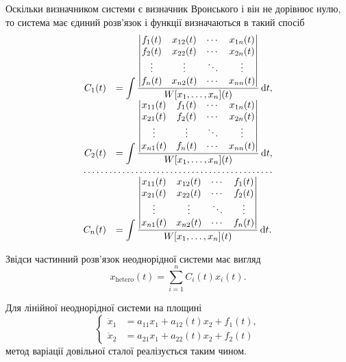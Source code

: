 Оскільки визначником системи є визначник Вронського і він не дорівнює нулю, то система має єдиний розв'язок і функції  визначаються в такий спосіб
\begin{equation*}
	\begin{array}{rl}
		C_1(t) &= \displaystyle \int \frac{\begin{vmatrix} f_1(t) & x_{12}(t) & \cdots & x_{1n}(t) \\ f_2(t) & x_{22}(t) & \cdots & x_{2n}(t) \\ \vdots & \vdots & \ddots & \vdots \\ f_n(t) & x_{n2}(t) & \cdots & x_{nn}(t) \end{vmatrix}}{W[x_1, \ldots, x_n](t)} \diff t, \\
		C_2(t) &= \displaystyle \int \frac{\begin{vmatrix} x_{11}(t) & f_1(t) & \cdots & x_{1n}(t) \\ x_{21}(t) & f_2(t) & \cdots & x_{2n}(t) \\ \vdots & \vdots & \ddots & \vdots \\ x_{n1}(t) & f_n(t) & \cdots & x_{nn}(t) \end{vmatrix}}{W[x_1, \ldots, x_n](t)} \diff t, \\
		\hdotsfor{2} \\
		C_n(t) &= \displaystyle \int \frac{\begin{vmatrix} x_{11}(t) & x_{12}(t) & \cdots & f_1(t) \\ x_{21}(t) & x_{22}(t) & \cdots & f_2(t) \\ \vdots & \vdots & \ddots & \vdots \\ x_{n1}(t) & x_{n2}(t) & \cdots & f_n(t) \end{vmatrix}}{W[x_1, \ldots, x_n](t)} \diff t.
	\end{array}
\end{equation*}

Звідси частинний розв'язок неоднорідної системи має вигляд
\begin{equation*}
	x_{\text{hetero}}(t) = \sum_{i = 1}^n C_i(t) x_i(t).
\end{equation*}

Для лінійної неоднорідної системи на площині 
\begin{equation*}
	\left\{
		\begin{aligned}
			\dot x_1 &= a_{11} x_1 + a_{12}(t) x_2 + f_1(t), \\
			\dot x_2 &= a_{21} x_1 + a_{22}(t) x_2 + f_2(t) 
		\end{aligned}
	\right.
\end{equation*}
метод варіації довільної сталої реалізується таким чином. \parvskip

